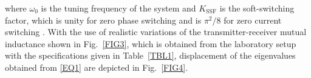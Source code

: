 \documentclass[journal,a4paper,10pt,twoside]{IEEEtran} %
\begin{document}
	\noindent where $\omega_0$ is the tuning frequency of the system and $K_\mathrm{SSF}$ is the soft-switching factor, which is unity for zero phase switching and is ${\pi^2}/{8}$ for zero current switching \cite{pantic}.
	With the use of realistic variations of the transmitter-receiver mutual inductance shown in Fig.~\ref{FIG3}, which is obtained from the laboratory setup with the specifications given in Table~\ref{TBL1}, displacement of the eigenvalues obtained from \eqref{EQ1} are depicted in Fig.~\ref{FIG4}.
	
	\begin{figure}
	    \begin{center}
        \\
	    \vspace{-3mm}
	    \\
	    \vspace{-3mm}
\end{center}
\end{figure}
\end{document}
